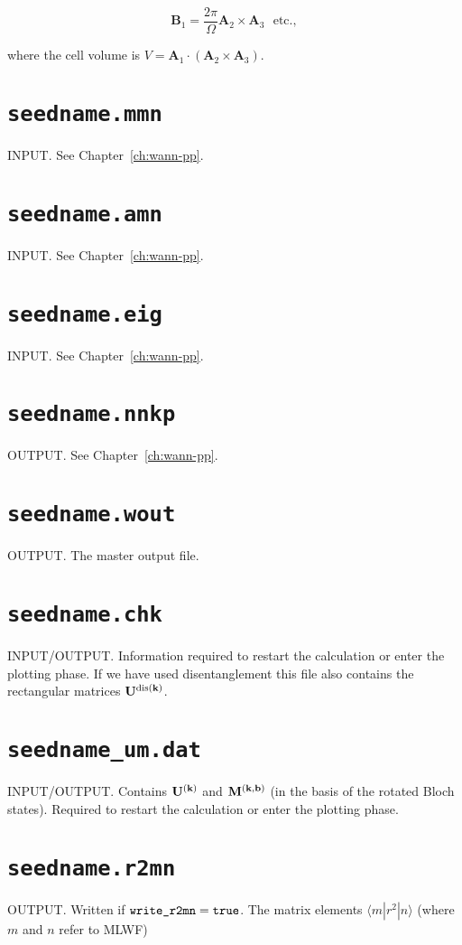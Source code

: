 \begin{equation}
\mathbf{B}_{1} = \frac{2\pi}{\Omega}\mathbf{A}_{2}\times\mathbf{A}_{3}
\ \ \ \mathrm{etc.},
\end{equation}

where the cell volume is
$V=\mathbf{A}_{1}\cdot(\mathbf{A}_{2}\times\mathbf{A}_{3})$.

\section{{\tt seedname.mmn}}
INPUT. See Chapter~\ref{ch:wann-pp}.

\section{{\tt seedname.amn}}
INPUT. See Chapter~\ref{ch:wann-pp}.

\section{{\tt seedname.eig}}
INPUT. See Chapter~\ref{ch:wann-pp}.

\section{{\tt seedname.nnkp}} \label{sec:old-nnkp}
OUTPUT. See Chapter~\ref{ch:wann-pp}.

\section{{\tt seedname.wout}}
OUTPUT. The master output file.

\section{{\tt seedname.chk}}
INPUT/OUTPUT. Information required to restart the calculation or enter the
plotting phase. If we have used disentanglement this file also contains the
rectangular matrices $\bf{U}^{{\rm dis}({\bf k})}$.

\section{{\tt seedname\_um.dat}}
INPUT/OUTPUT. Contains $\bf{U}^{({\bf k})}$ and $\bf{M}^{(\bf{k,b})}$ (in the
basis of the rotated Bloch states). Required to restart the calculation or enter the
plotting phase.

\section{{\tt seedname.r2mn}}
OUTPUT.
Written if $\verb#write_r2mn#=\verb#true#$. The matrix elements
$\langle m|r^2|n\rangle$ (where $m$ and $n$ refer to MLWF)

